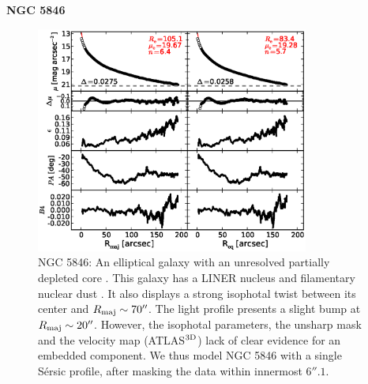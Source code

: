 \documentclass[preprint2]{emulateapj}
\newcommand{\fitfigurewidth}{0.8\textwidth}
\begin{document}
  \clearpage\newpage\noindent
  {\bf NGC 5846 \\}

  \begin{figure}[h]
  \begin{center}
  \includegraphics[width=\fitfigurewidth]{images/n5846_1Dfit.eps}
  \caption{NGC 5846: 
  An elliptical galaxy with an unresolved partially depleted core \citep{rusli2013}. %
  This galaxy has a LINER nucleus \citep{carrillo1999} and filamentary nuclear dust \citep{tran2001}.
  It also displays a strong isophotal twist between its center and $R_{\rm maj} \sim 70''$.
  The light profile presents a slight bump at $R_{\rm maj} \sim 20''$.
  However, the isophotal parameters, the unsharp mask and the velocity map (ATLAS$^{\rm 3D}$) lack of clear evidence for an embedded component.
  We thus model NGC 5846 with a single S\'ersic profile, after masking the data within innermost $6''.1$.
  }
  \end{center}
  \end{figure}
\end{document}
